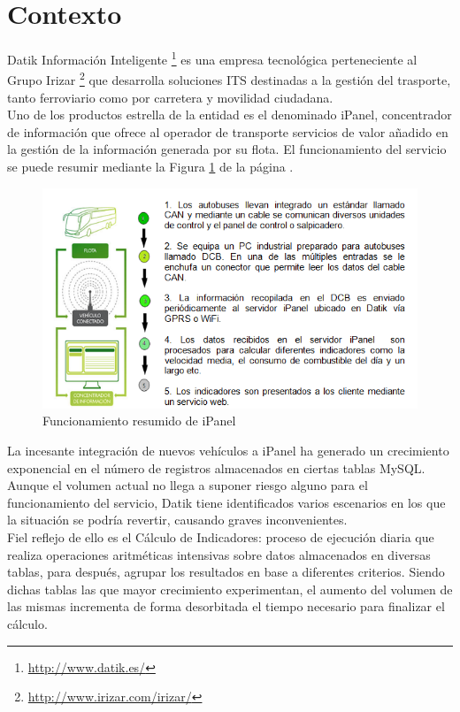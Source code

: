 \section{Contexto}
 
Datik Información Inteligente \footnote{\url{http://www.datik.es/}} es una empresa tecnológica perteneciente al Grupo Irizar \footnote{\url{http://www.irizar.com/irizar/}} que desarrolla soluciones ITS destinadas a la gestión del trasporte, tanto ferroviario como por carretera y movilidad ciudadana.\\

Uno de los productos estrella de la entidad es el denominado iPanel, concentrador de  información que ofrece al operador de transporte servicios de valor añadido en la gestión de la información generada por su flota. El funcionamiento del servicio se puede resumir mediante la Figura \ref{fig:ipanel} de la página \pageref{fig:ipanel}.

\begin{figure}[h]
	\centering
	\includegraphics[width=1\textwidth]{Ilustraciones/ipanel_infraesctructure.png}
	\caption{Funcionamiento resumido de iPanel}
	\label{fig:ipanel}
\end{figure}

La incesante integración de nuevos vehículos a iPanel ha generado un crecimiento exponencial en el número de registros almacenados en ciertas tablas MySQL. Aunque el volumen actual no llega a suponer riesgo alguno para el funcionamiento del servicio, Datik tiene identificados varios escenarios en los que la situación se podría revertir, causando graves inconvenientes.\\

Fiel reflejo de ello es el Cálculo de Indicadores: proceso de ejecución diaria que realiza operaciones aritméticas intensivas sobre datos almacenados en diversas tablas, para después, agrupar los resultados en base a diferentes criterios. Siendo dichas tablas las que mayor crecimiento experimentan, el aumento del volumen de las mismas incrementa de forma desorbitada el tiempo necesario para finalizar el cálculo.\\

